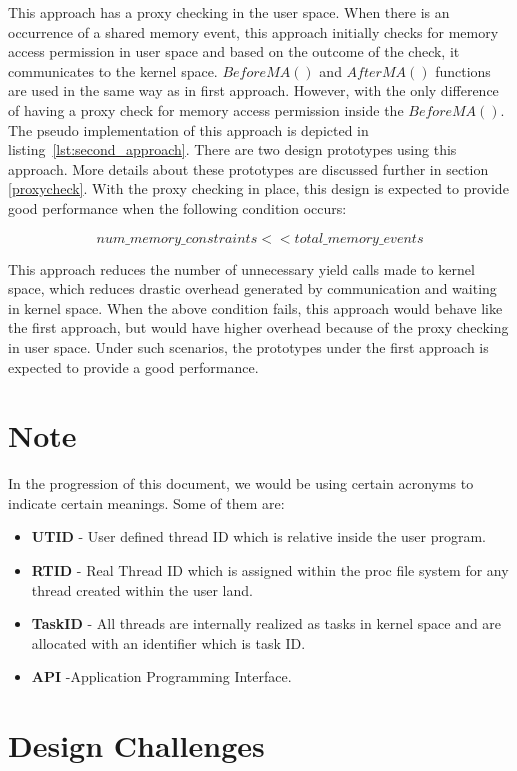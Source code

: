 This approach has a proxy checking in the user space. 
When there is an occurrence of a shared memory event, this approach initially checks for memory access permission in user space and based on the outcome of the check, it communicates to the kernel space. 
$BeforeMA()$ and $AfterMA()$ functions are used in the same way as in first approach. 
However, with the only difference of having a proxy check for memory access permission inside the $BeforeMA()$. 
The pseudo implementation of this approach is depicted in listing~\ref{lst:second_approach}.
There are two design prototypes using this approach. More details about these prototypes are discussed further in section \ref{proxycheck}.
With the proxy checking in place, this design is expected to provide good performance when the following condition occurs: 

\begin{equation}
num\_memory\_constraints << total\_memory\_events
\label{mem_cond}
\end{equation}


This approach reduces the number of unnecessary yield calls made to kernel space, which reduces drastic overhead generated by communication and waiting in kernel space. 
When the above condition fails, this approach would behave like the first approach, but would have higher overhead because of the proxy checking in user space. 
Under such scenarios, the prototypes under the first approach is expected to provide a good performance. 


\section*{Note}
In the progression of this document, we would be using certain acronyms to indicate certain meanings. 
Some of them are:
\begin{itemize}
\item \textbf{UTID} - User defined thread ID which is relative inside the user program. 
\item \textbf{RTID} - Real Thread ID which is assigned within the proc file system for any thread created within the user land. 
\item \textbf{TaskID} - All threads are internally realized as tasks in kernel space and are allocated with an identifier which is task ID.
\item \textbf{API} -Application Programming Interface.
\end{itemize}

\section{Design Challenges}

